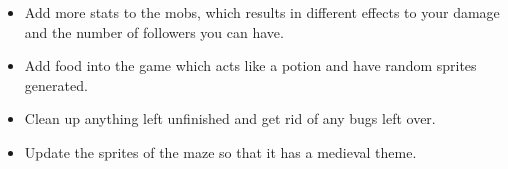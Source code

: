 \documentclass[../Main.tex]{subfiles}
\begin{document}
\begin{itemize}
\begin{itemize}
                    \item Add more stats to the mobs, which results in different effects to your damage and the number of followers you can have.
                    \item Add food into the game which acts like a potion and have random sprites generated.
                    \item Clean up anything left unfinished and get rid of any bugs left over.
                    \item Update the sprites of the maze so that it has a medieval theme.
                \end{itemize}
        \end{itemize}
\end{document}
